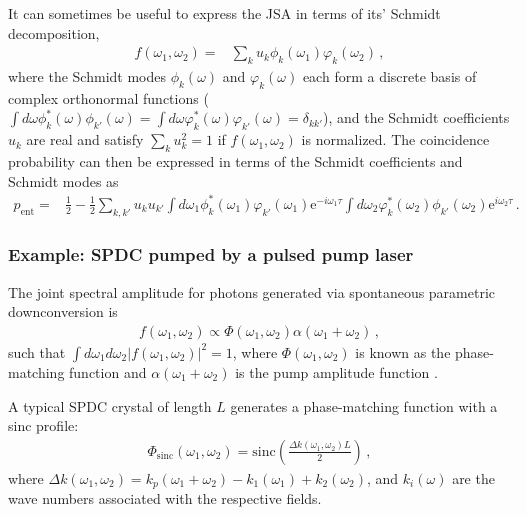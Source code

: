 \documentclass[12pt]{article}
\newcommand{\ee}[1] {\mathrm{e}^{#1}}
\begin{document}
It can sometimes be useful to express the JSA in terms of its' Schmidt decomposition,
\begin{align}
f(\omega_1,\omega_2)={}&\sum_{k}u_k \phi_k(\omega_1)\varphi_k(\omega_2)\,,
\end{align}
where the Schmidt modes $\phi_k(\omega)$ and $\varphi_k(\omega)$ each form a discrete basis of complex orthonormal functions ($\int d\omega \phi^*_k(\omega)\phi_{k'}(\omega)=\int d\omega \varphi^*_k(\omega)\varphi_{k'}(\omega)=\delta_{kk'}$), and the Schmidt coefficients ${u}_{k}$ are real and satisfy $\sum_{k}{u}_{k}^2=1$ if $f(\omega_{1},\omega_{2})$ is normalized. The coincidence probability can then be expressed in terms of the Schmidt coefficients and Schmidt modes as
\begin{align}
p_{\mathrm{ent}}={}&\frac{1}{2}-\frac{1}{2}\sum_{k,k'}u_ku_{k'}\int d\omega_{1}  \phi^*_k(\omega_1)\varphi_{k'}(\omega_1)\ee{-i\omega_1\tau} \int d\omega_{2}\varphi^*_k(\omega_2)\phi_{k'}(\omega_2)\ee{i\omega_2\tau}\,.
\end{align}

\subsubsection{Example: SPDC pumped by a pulsed pump laser}

The joint spectral amplitude for photons generated via spontaneous parametric downconversion is 
\begin{align}
f(\omega_1,\omega_2)\propto \Phi(\omega_{1},\omega_{2})\alpha(\omega_{1}+\omega_{2})\,,
\end{align}
such that $\int d\omega_1 d\omega_2|f(\omega_1,\omega_2)|^2=1$, where $\Phi(\omega_{1},\omega_{2})$ is known as the phase-matching function and $\alpha(\omega_1+\omega_2)$ is the pump amplitude function \cite{Grice1997}. 

A typical SPDC crystal of length $L$ generates a phase-matching function with a sinc profile:
\begin{align}
\Phi_{\mathrm{sinc}}(\omega_1,\omega_2)=\mathrm{sinc}\left(\frac{\Delta k(\omega_1,\omega_2)L}{2}\right)\,,
\end{align}
where $\Delta k(\omega_1,\omega_2)=k_p(\omega_1+\omega_2)-k_1(\omega_1)+k_2(\omega_2)$, and $k_i(\omega)$ are the wave numbers associated with the respective fields. 
\end{document}
